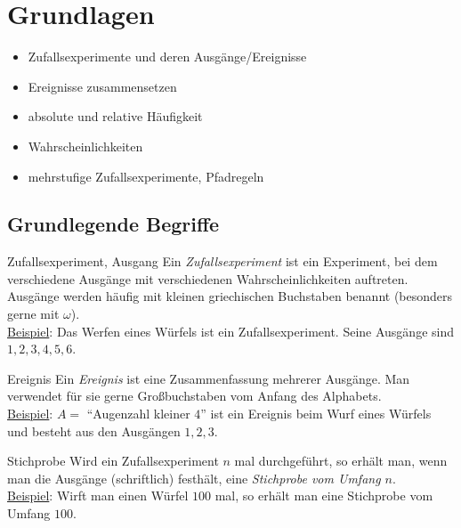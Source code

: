 \chapter{Grundlagen}
\begin{inhalt}
  \begin{itemize}
    \item Zufallsexperimente und deren Ausgänge/Ereignisse
    \item Ereignisse zusammensetzen
    \item absolute und relative Häufigkeit
    \item Wahrscheinlichkeiten
    \item mehrstufige Zufallsexperimente, Pfadregeln
  \end{itemize}
\end{inhalt}

\section{Grundlegende Begriffe}

\begin{bla}{Zufallsexperiment, Ausgang}
  Ein \emph{Zufallsexperiment} ist ein Experiment, bei dem verschiedene Ausgänge
  mit verschiedenen Wahrscheinlichkeiten auftreten. Ausgänge werden häufig mit kleinen griechischen Buchstaben benannt (besonders gerne mit $\omega$).
  \\
  \underline{Beispiel}: Das Werfen eines Würfels ist ein Zufallsexperiment. Seine Ausgänge sind $1,2,3,4,5,6$.
\end{bla}

\begin{bla}{Ereignis}
  Ein \emph{Ereignis} ist eine Zusammenfassung mehrerer Ausgänge. Man verwendet für sie gerne Großbuchstaben vom Anfang des Alphabets.
  \\
  \underline{Beispiel}: $A=$ "`Augenzahl kleiner $4$"' ist ein Ereignis beim Wurf eines Würfels und besteht aus den Ausgängen $1,2,3$.
\end{bla}

\begin{bla}{Stichprobe}
  Wird ein Zufallsexperiment $n$ mal durchgeführt, so erhält man, wenn man die
  Ausgänge (schriftlich) festhält, eine \emph{Stichprobe vom Umfang $n$}.
  \\
  \underline{Beispiel}: Wirft man einen Würfel $100$ mal, so erhält man eine Stichprobe
  vom Umfang $100$.
\end{bla}

\clearpage

